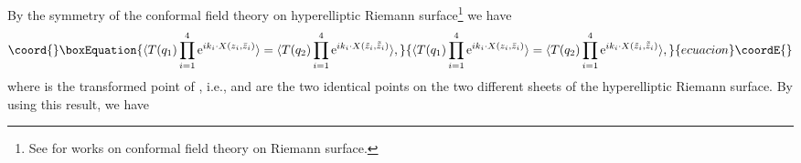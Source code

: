 \documentclass[a4paper,12pt]{article}
\begin{document}
By the \coordHE{} symmetry of the conformal field theory on
hyperelliptic Riemann surface\footnote{See \cite{Dixon,
Zamolodchikov, Radul, Knizhnik2} for works on conformal field
theory on \coordHE{} Riemann surface.} we have
\begin{equation}\coord{}\boxEquation{
\langle T(q_1) \prod_{i=1}^4 \hbox{e}^{i k_i \cdot X(z_i, \bar
z_i)} \rangle = \langle T(q_2) \prod_{i=1}^4 \hbox{e}^{i k_i \cdot
X(\tilde z_i, \tilde{\bar z}_i)} \rangle,
}{
\langle T(q_1) \prod_{i=1}^4 \hbox{e}^{i k_i \cdot X(z_i, \bar
z_i)} \rangle = \langle T(q_2) \prod_{i=1}^4 \hbox{e}^{i k_i \cdot
X(\tilde z_i, \tilde{\bar z}_i)} \rangle,
}{ecuacion}\coordE{}\end{equation}
where \coordHE{} is the \coordHE{} transformed point of \coordHE{}, i.e.,
\coordHE{} and \coordHE{} are the two identical points on the two
different sheets of the hyperelliptic Riemann surface. By using
this result,  we have
\end{document}
